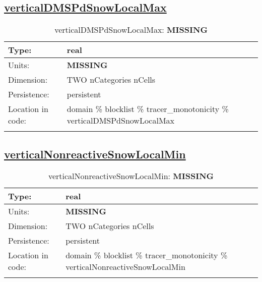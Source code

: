 \subsection[verticalDMSPdSnowLocalMax]{\hyperref[sec:var_tab_tracer_monotonicity]{verticalDMSPdSnowLocalMax}}
\label{subsec:var_sec_tracer_monotonicity_verticalDMSPdSnowLocalMax}
\begin{center}
\begin{longtable}{| p{2.0in} | p{4.0in} |}
        \hline 
        Type: & real \\
        \hline 
        Units: & {\bf \color{red} MISSING} \\
        \hline 
        Dimension: & TWO nCategories nCells \\
        \hline 
        Persistence: & persistent \\
        \hline 
         Location in code: & domain \% blocklist \% tracer\_monotonicity \% verticalDMSPdSnowLocalMax \\
         \hline 
    \caption{verticalDMSPdSnowLocalMax: {\bf \color{red} MISSING}}
\end{longtable}
\end{center}
\subsection[verticalNonreactiveSnowLocalMin]{\hyperref[sec:var_tab_tracer_monotonicity]{verticalNonreactiveSnowLocalMin}}
\label{subsec:var_sec_tracer_monotonicity_verticalNonreactiveSnowLocalMin}
\begin{center}
\begin{longtable}{| p{2.0in} | p{4.0in} |}
        \hline 
        Type: & real \\
        \hline 
        Units: & {\bf \color{red} MISSING} \\
        \hline 
        Dimension: & TWO nCategories nCells \\
        \hline 
        Persistence: & persistent \\
        \hline 
         Location in code: & domain \% blocklist \% tracer\_monotonicity \% verticalNonreactiveSnowLocalMin \\
         \hline 
    \caption{verticalNonreactiveSnowLocalMin: {\bf \color{red} MISSING}}
\end{longtable}
\end{center}
